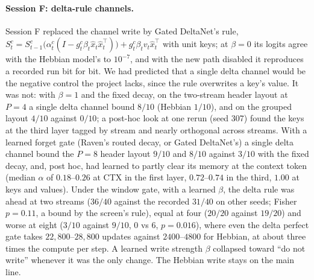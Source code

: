 \documentclass[11pt]{article}
\begin{document}
\paragraph{Session F: delta-rule channels.} Session F replaced the channel write by Gated DeltaNet's rule, $S^c_t = S^c_{t-1}\bigl(\alpha^c_t(I - g^c_t \beta_t \hat{x}_t \hat{x}_t^\top)\bigr) + g^c_t \beta_t v_t \hat{x}_t^\top$ with unit keys; at $\beta = 0$ its logits agree with the Hebbian model's to $10^{-7}$, and with the new path disabled it reproduces a recorded run bit for bit. We had predicted that a single delta channel would be the negative control the project lacks, since the rule overwrites a key's value. It was not: with $\beta = 1$ and the fixed decay, on the two-stream header layout at $P = 4$ a single delta channel bound $8/10$ (Hebbian $1/10$), and on the grouped layout $4/10$ against $0/10$; a post-hoc look at one rerun (seed 307) found the keys at the third layer tagged by stream and nearly orthogonal across streams. With a learned forget gate (Raven's routed decay, or Gated DeltaNet's) a single delta channel bound the $P = 8$ header layout $9/10$ and $8/10$ against $3/10$ with the fixed decay, and, post hoc, had learned to partly clear its memory at the context token (median $\alpha$ of $0.18$--$0.26$ at CTX in the first layer, $0.72$--$0.74$ in the third, $1.00$ at keys and values). Under the window gate, with a learned $\beta$, the delta rule was ahead at two streams ($36/40$ against the recorded $31/40$ on other seeds; Fisher $p = 0.11$, a bound by the screen's rule), equal at four ($20/20$ against $19/20$) and worse at eight ($3/10$ against $9/10$, 0 vs 6, $p = 0.016$), where even the delta perfect gate takes $22{,}800$--$28{,}800$ updates against $2400$--$4800$ for Hebbian, at about three times the compute per step. A learned write strength $\beta$ collapsed toward ``do not write'' whenever it was the only change. The Hebbian write stays on the main line.
\end{document}

